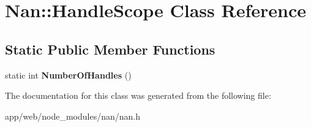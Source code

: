 \hypertarget{class_nan_1_1_handle_scope}{}\section{Nan\+:\+:Handle\+Scope Class Reference}
\label{class_nan_1_1_handle_scope}
\subsection*{Static Public Member Functions}
\begin{DoxyCompactItemize}
\item 
\mbox{\label{class_nan_1_1_handle_scope_a292cf5fcd1245074277bbc74ed4eb577}} 
static int {\bfseries Number\+Of\+Handles} ()
\end{DoxyCompactItemize}


The documentation for this class was generated from the following file\+:\begin{DoxyCompactItemize}
\item 
app/web/node\+\_\+modules/nan/nan.\+h\end{DoxyCompactItemize}
